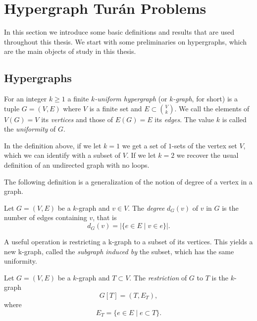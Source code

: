 
\section{Hypergraph Turán Problems}\label{sec:preliminaries}
In this section we introduce some basic definitions and results that are used throughout this thesis.
We start with some preliminaries on hypergraphs, which are the main objects of study in this thesis.

\subsection{Hypergraphs}\label{subsec:hypergraphs}

\begin{definition}

    For an integer $k \geq 1$ a finite \emph{$k$-uniform hypergraph} (or \emph{$k$-graph}, for short)
    is a tuple $G = (V, E)$ where $V$ is a finite set
    and $E \subset \binom{V}{k}$.
    We call the elements of $V(G) = V$ its \emph{vertices}
    and those of $E(G) = E$ its \emph{edges}.
    The value $k$ is called the \emph{uniformity} of $G$.
\end{definition}

\begin{remark}
    In the definition above, if we let $k=1$ we get a set of $1$-sets of the vertex set $V$,
    which we can identify with a subset of $V$.
    If we let $k=2$ we recover the usual definition of an undirected graph with no loops.
\end{remark}

The following definition is a generalization of the notion of degree
of a vertex in a graph.

\begin{definition}
    Let $G = (V, E)$ be a $k$-graph and $v \in V$.
    The \emph{degree} $d_G(v)$ of $v$ in $G$
    is the number of edges containing $v$, that is
    \[
        d_G(v) = |\{e \in E \mid v \in e\}|.
    \]
\end{definition}

A useful operation is restricting a k-graph to a subset of its vertices.
This yields a new k-graph, called the \emph{subgraph induced by} the subset, which has the same uniformity.

\begin{definition}

    \label{def:restriction}
    Let $G = (V, E)$ be a $k$-graph and $T \subset V$.
    The \emph{restriction} of $G$ to $T$ is the $k$-graph
    \[
        G[T] = (T, E_T),
    \]
    where
    \[E_T = \{e \in E \mid e \subset T\}.\]
\end{definition}

